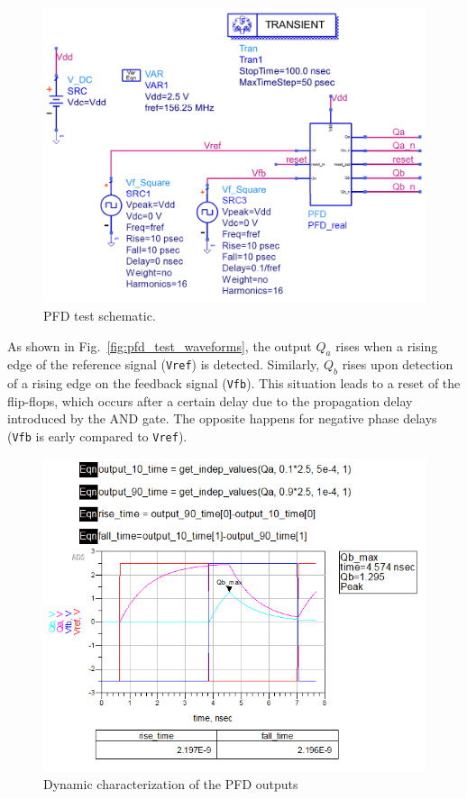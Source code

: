 \documentclass[lettersize,journal]{IEEEtran}
\begin{document}
\begin{figure}[!ht]
    \centering
    \includegraphics[width=1\linewidth]{images/block_design/PFD/pfd_test.png}
    \caption{PFD test schematic.}
    \label{fig:pfd_test}
\end{figure}

As shown in Fig.~\ref{fig:pfd_test_waveforms}, the output \( Q_a \) rises when a rising edge of the reference signal (\texttt{Vref}) is detected. Similarly, \( Q_b \) rises upon detection of a rising edge on the feedback signal (\texttt{Vfb}). This situation leads to a reset of the flip-flops, which occurs after a certain delay due to the propagation delay introduced by the AND gate. The opposite happens for negative phase delays (\texttt{Vfb} is early compared to \texttt{Vref}).

\begin{figure}[!ht]
    \centering
    \includegraphics[width=1\linewidth]{images/block_design/PFD/pfd_test_measure.png}
    \caption{Dynamic characterization of the PFD outputs}
    \label{fig:pfd_dynamic}
\end{figure}
\end{document}
